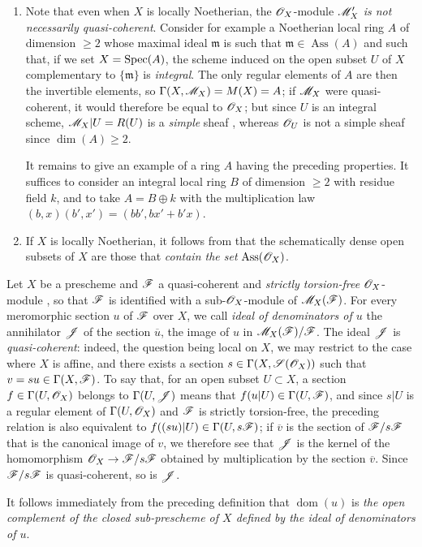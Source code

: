 \begin{remarks}[20.2.13]
\begin{enumerate}[label=(\roman*)]
  \item Note that even when $X$ is locally Noetherian, the $\mathscr{O}_X$-module $\mathscr{M}'_X$ \emph{is not necessarily quasi-coherent}.
  Consider for example a Noetherian local ring $A$ of dimension $\geq2$ whose maximal ideal $\mathfrak{m}$ is such that $\mathfrak{m}\in\operatorname{Ass}(A)$ and such that, if we set $X=\operatorname{Spec}(A)$, the scheme induced on the open subset $U$ of $X$ complementary to $\{\mathfrak{m}\}$ is \emph{integral}.
  The only regular elements of $A$ are then the invertible elements, so $\Gamma(X,\mathscr{M}_X)=M(X)=A$; if $\mathscr{M}_X$ were quasi-coherent, it would therefore be equal to $\mathscr{O}_X$; but since $U$ is an integral scheme, $\mathscr{M}_X|U=R(U)$ is a \emph{simple} sheaf , whereas $\mathscr{O}_U$ is not a simple sheaf since $\dim(A)\geq2$.

  It remains to give an example of a ring $A$ having the preceding properties.
  It suffices to consider an integral local ring $B$ of dimension $\geq2$ with residue field $k$, and to take $A=B\oplus k$ with the multiplication law $(b,x)(b',x')=(bb',bx'+b'x)$.

  \item If $X$ is locally Noetherian, it follows from  that the schematically dense open subsets of $X$ are those that \emph{contain the set} $\operatorname{Ass}(\mathscr{O}_X)$.
\end{enumerate}
\end{remarks}

\begin{env}[20.2.14]\label{IV.20.2.14}
Let $X$ be a prescheme and $\mathscr{F}$ a quasi-coherent and \emph{strictly torsion-free} $\mathscr{O}_X$-module , so that $\mathscr{F}$ is identified with a sub-$\mathscr{O}_X$-module of $\mathscr{M}_X(\mathscr{F})$.
For every meromorphic section $u$ of $\mathscr{F}$ over $X$, we call \emph{ideal of denominators of $u$} the annihilator $\mathscr{J}$ of the section $\overline{u}$, the image of $u$ in $\mathscr{M}_X(\mathscr{F})/\mathscr{F}$.
The ideal $\mathscr{J}$ is \emph{quasi-coherent}: indeed, the question being local on $X$, we may restrict to the case where $X$ is affine, and there exists a section $s\in\Gamma(X,\mathscr{S}(\mathscr{O}_X))$ such that $v=su\in\Gamma(X,\mathscr{F})$.
To say that, for an open subset $U\subset X$, a section $f\in\Gamma(U,\mathscr{O}_X)$ belongs to $\Gamma(U,\mathscr{J})$ means that $f(u|U)\in\Gamma(U,\mathscr{F})$, and since $s|U$ is a regular element of $\Gamma(U,\mathscr{O}_X)$ and $\mathscr{F}$ is strictly torsion-free, the preceding relation is also equivalent to $f((su)|U)\in\Gamma(U,s\mathscr{F})$; if $\overline{v}$ is the section of $\mathscr{F}/s\mathscr{F}$ that is the canonical image of $v$, we therefore see that $\mathscr{J}$ is the kernel of the homomorphism $\mathscr{O}_X\to\mathscr{F}/s\mathscr{F}$ obtained by multiplication by the section $\overline{v}$.
Since $\mathscr{F}/s\mathscr{F}$ is quasi-coherent, so is $\mathscr{J}$.

It follows immediately from the preceding definition that $\operatorname{dom}(u)$ is \emph{the open complement of the closed sub-prescheme of $X$ defined by the ideal of denominators of $u$}.
\end{env}

